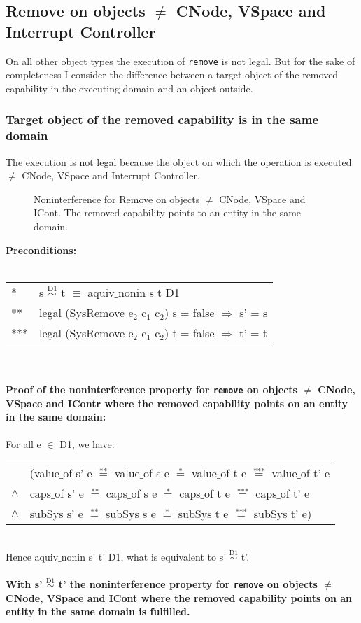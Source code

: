 \subsection{Remove on objects $\neq$ CNode, VSpace and Interrupt Controller} 
On all other object types the execution of \texttt{remove} is not legal. But for the sake of completeness I consider the difference between a target object of the removed capability in the executing domain and an object outside.
\subsubsection{Target object of the removed capability is in the same domain} 
The execution is not legal because the object on which the operation is executed $\neq$ CNode, VSpace and Interrupt Controller.
\begin{figure}[H]
\caption{Noninterference for Remove on objects $\neq$ CNode, VSpace and ICont. The removed capability points to an entity in the same domain.}
\label{fig:RemoveOthers}
\end{figure}
\textbf{Preconditions:} \\ \\
\begin{tabular}{ll}
* & s $\overset{\text{D1}}{\sim}$ t $\equiv$ aquiv$\_$nonin s t D1	\\ 
** & legal (SysRemove e$_2$ c$_1$ c$_2$) s = false $\Rightarrow$ s' = s \\ 
*** & legal (SysRemove e$_2$ c$_1$ c$_2$) t = false $\Rightarrow$ t' = t
\end{tabular} \\ \\ 
\textbf{Proof of the noninterference property for \texttt{remove} on objects $\neq$ CNode, VSpace and IContr where the removed capability points on an entity in the same domain:}\\ \\
For all e $\in$ D1, we have: \\ 
\begin{tabular}{ll}
& (value$\_$of s' e $\overset{\text{**}}{=}$ value$\_$of s e $\overset{\text{*}}{=}$ value$\_$of t e $\overset{\text{***}}{=}$ value$\_$of t' e \\
$\wedge$ & caps$\_$of s' e $\overset{\text{**}}{=}$ caps$\_$of s e $\overset{\text{*}}{=}$ caps$\_$of t e $\overset{\text{***}}{=}$ caps$\_$of t' e \\
$\wedge$ & subSys s' e $\overset{\text{**}}{=}$ subSys s e $\overset{\text{*}}{=}$ subSys t e $\overset{\text{***}}{=}$ subSys t' e)
\end{tabular} \\
Hence aquiv$\_$nonin s' t' D1, what is equivalent to s' $\overset{\text{D1}}{\sim}$ t'. \\ \\ 
\textbf{With s' $\overset{\text{D1}}{\sim}$ t' the noninterference property for \texttt{remove} on objects $\neq$ CNode, VSpace and ICont where the removed capability points on an entity in the same domain is fulfilled.}  

